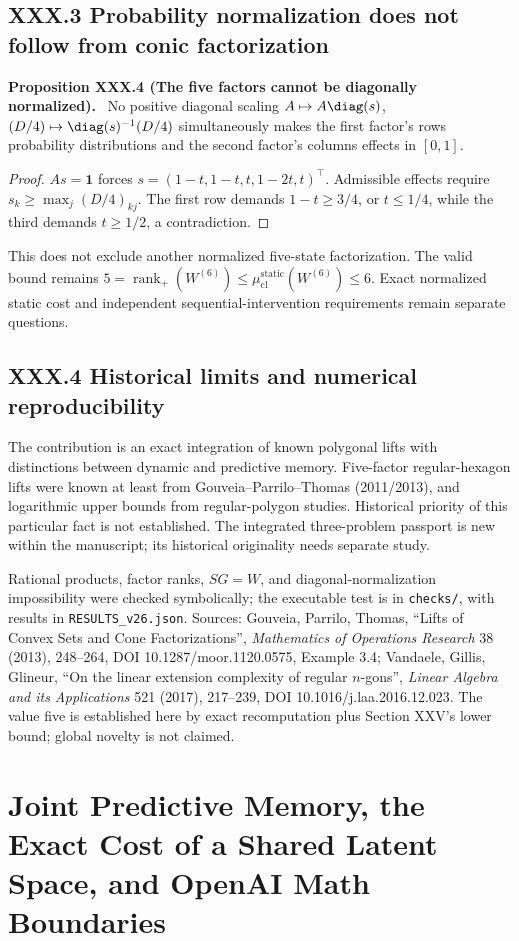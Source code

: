 \documentclass[11pt,a4paper,oneside]{book}
\newcommand{\one}{\mathbf 1}\newcommand{\ii}{\mathrm i}\newcommand{\dd}{\mathrm d}
\DeclareMathOperator{\rank}{rank}\DeclareMathOperator{\Tr}{Tr}
\newcommand{\statement}[3]{\par\medskip\noindent\textbf{#1 #2 (#3).}\ }
\begin{document}
\section*{XXX.3 Probability normalization does not follow from conic factorization}
\statement{Proposition}{XXX.4}{The five factors cannot be diagonally normalized} No positive diagonal scaling $A\mapsto A\diag(s)$, $(D/4)\mapsto\diag(s)^{-1}(D/4)$ simultaneously makes the first factor's rows probability distributions and the second factor's columns effects in $[0,1]$.
\begin{proof}$As=\one$ forces $s=(1-t,1-t,t,1-2t,t)^\top$. Admissible effects require $s_k\ge\max_j(D/4)_{kj}$. The first row demands $1-t\ge3/4$, or $t\le1/4$, while the third demands $t\ge1/2$, a contradiction.\end{proof}
This does not exclude another normalized five-state factorization. The valid bound remains $5=\rank_+(W^{(6)})\le\mu_{\mathrm{cl}}^{\mathrm{static}}(W^{(6)})\le6$. Exact normalized static cost and independent sequential-intervention requirements remain separate questions.
\section*{XXX.4 Historical limits and numerical reproducibility}
The contribution is an exact integration of known polygonal lifts with distinctions between dynamic and predictive memory. Five-factor regular-hexagon lifts were known at least from Gouveia--Parrilo--Thomas (2011/2013), and logarithmic upper bounds from regular-polygon studies. Historical priority of this particular fact is not established. The integrated three-problem passport is new within the manuscript; its historical originality needs separate study.

Rational products, factor ranks, $SG=W$, and diagonal-normalization impossibility were checked symbolically; the executable test is in \texttt{checks/}, with results in \texttt{RESULTS\_v26.json}. Sources: Gouveia, Parrilo, Thomas, ``Lifts of Convex Sets and Cone Factorizations'', \textit{Mathematics of Operations Research} 38 (2013), 248--264, DOI 10.1287/moor.1120.0575, Example 3.4; Vandaele, Gillis, Glineur, ``On the linear extension complexity of regular $n$-gons'', \textit{Linear Algebra and its Applications} 521 (2017), 217--239, DOI 10.1016/j.laa.2016.12.023. The value five is established here by exact recomputation plus Section XXV's lower bound; global novelty is not claimed.
\chapter{Joint Predictive Memory, the Exact Cost of a Shared Latent Space, and OpenAI Math Boundaries}
\end{document}
